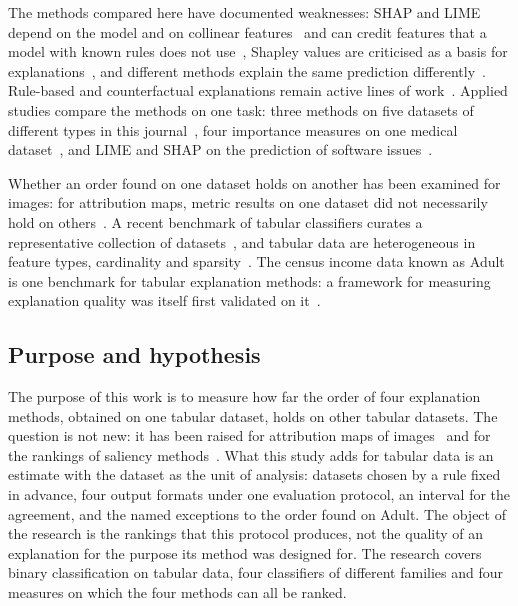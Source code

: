 \documentclass[10pt,a4paper,twocolumn]{article}
\begin{document}
The methods compared here have documented weaknesses: SHAP and LIME depend on the model
and on collinear features~\cite{salih2024perspective} and can credit features that a
model with known rules does not use~\cite{hooshyar2024problems}, Shapley values are
criticised as a basis for explanations~\cite{huang2024failings}, and different methods
explain the same prediction
differently~\cite{parashar2026agreement,gao2026uncertainty}. Rule-based and
counterfactual explanations remain active lines of
work~\cite{tekin2026fuzzy,redelmeier2024mcce}. Applied studies compare the methods on
one task: three methods on five datasets of different types in this
journal~\cite{kuszewska2026comparative}, four importance measures on one medical
dataset~\cite{biesaga2026comparison}, and LIME and SHAP on the prediction of software
issues~\cite{schulte2024studying}.

Whether an order found on one dataset holds on another has been examined for images: for
attribution maps, metric results on one dataset did not necessarily hold on
others~\cite{gevaert2024evaluating}. A recent benchmark of tabular classifiers
curates a representative collection of datasets~\cite{erickson2025tabarena}, and
tabular data are heterogeneous in feature types, cardinality and
sparsity~\cite{somvanshi2026survey}. The census income data known as Adult is one
benchmark for tabular explanation methods: a framework for measuring explanation quality
was itself first validated on it~\cite{herrera2026framework}.

\subsection{Purpose and hypothesis}

The purpose of this work is to measure how far the order of four explanation methods,
obtained on one tabular dataset, holds on other tabular datasets. The question is not
new: it has been raised for attribution maps of images~\cite{gevaert2024evaluating} and
for the rankings of saliency methods~\cite{klein2024maze}. What this study adds for
tabular data is an estimate with the dataset as the unit of analysis: datasets chosen by
a rule fixed in advance, four output formats under one evaluation protocol, an interval
for the agreement, and the named exceptions to the order found on Adult. The object of
the research is the rankings that this protocol produces, not the quality of an
explanation for the purpose its method was designed for. The research covers binary
classification on tabular data, four classifiers of different families and four measures
on which the four methods can all be ranked.
\end{document}
